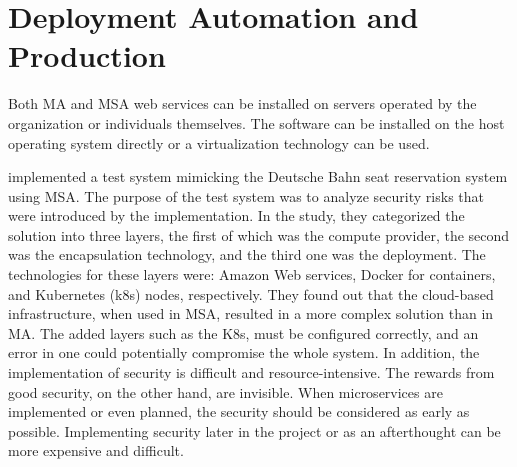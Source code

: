 
\section{Deployment Automation and Production}
\begin{sloppypar}
    Both MA and MSA web services can be installed on servers operated by the
    organization or individuals themselves. The software can be installed on the
    host operating system directly or a virtualization technology can be used.
\end{sloppypar}
\begin{sloppypar}
    \citet{closer18} implemented a test system mimicking the Deutsche Bahn seat
    reservation system using MSA. The purpose of the test system was to analyze
    security risks that were introduced by the implementation. In the study,
    they categorized the solution into three layers, the first of which was the
    compute provider, the second was the encapsulation technology, and the third
    one was the deployment. The technologies for these layers were: Amazon Web
    services, Docker for containers, and Kubernetes (k8s) nodes, respectively.
    They found out that the cloud-based infrastructure, when used in MSA,
    resulted in a more complex solution than in MA. The added layers such as the
    K8s, must be configured correctly, and an error in one could potentially
    compromise the whole system. In addition, the implementation of security is
    difficult and resource-intensive. The rewards from good security, on the
    other hand, are invisible. When microservices are implemented or even
    planned, the security should be considered as early as possible.
    Implementing security later in the project or as an afterthought can be more
    expensive and difficult.
\end{sloppypar}

